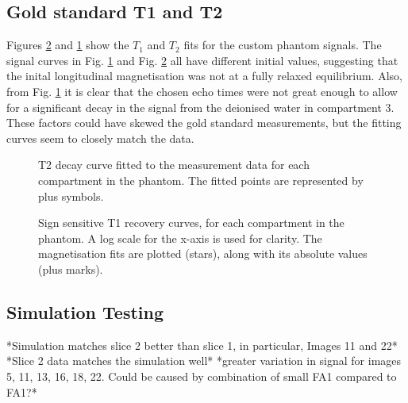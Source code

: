 \documentclass[journal]{IEEEtran}
\newlength\figureheight
\newlength\figurewidth
\begin{document}
\subsection{Gold standard T1 and T2}
Figures \ref{fig:JackT1fitALL} and \ref{fig:JackT2fitALL}  show the $T_1$ and $T_2$ fits for the custom phantom signals. The signal curves in Fig. \ref{fig:JackT2fitALL} and Fig. \ref{fig:JackT1fitALL}  all have different initial values, suggesting that the inital longitudinal magnetisation was not at a fully relaxed equilibrium. Also, from Fig. \ref{fig:JackT2fitALL} it is clear that the chosen echo times were not great enough to allow for a significant decay in the signal from the deionised water in compartment 3. These factors could have skewed the gold standard measurements, but the fitting curves seem to closely match the data. 

\begin{figure}
\centering
\begin{minipage}[c]{\columnwidth}
\setlength{}
\setlength{}



    \caption{T2 decay curve fitted to the measurement data for each compartment in the phantom. The fitted points are represented by plus symbols.}
    \label{fig:JackT2fitALL}
\end{minipage}
\end{figure}

\begin{figure}
\centering
\begin{minipage}[c]{\columnwidth}
\setlength{}
\setlength{}



    \caption{Sign sensitive T1 recovery curves, for each compartment in the phantom. A log scale for the x-axis is used for clarity. The magnetisation fits are plotted (stars), along with its absolute values (plus marks). }
    \label{fig:JackT1fitALL}
\end{minipage}
\end{figure}

\subsection{Simulation Testing}
*Simulation matches slice 2 better than slice 1, in particular, Images 11 and 22*
*Slice 2 data matches the simulation well*
*greater variation in signal for images 5, 11, 13, 16, 18, 22. Could be caused by combination of small FA1 compared to FA1?*
\end{document}
